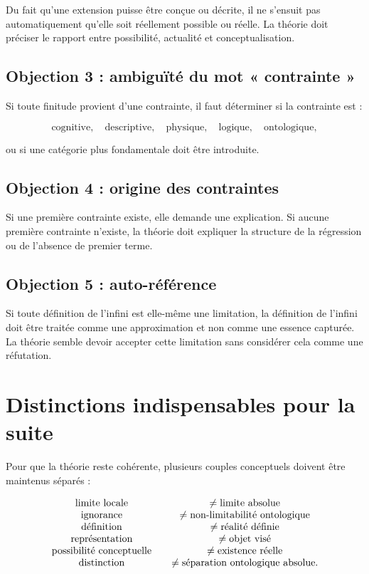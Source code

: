 \documentclass[11pt,a4paper]{article}
\begin{document}
Du fait qu'une extension puisse être conçue ou décrite, il ne s'ensuit pas automatiquement qu'elle soit réellement possible ou réelle. La théorie doit préciser le rapport entre possibilité, actualité et conceptualisation.

\subsection{Objection 3 : ambiguïté du mot « contrainte »}

Si toute finitude provient d'une contrainte, il faut déterminer si la contrainte est :

\[
\text{cognitive},\quad \text{descriptive},\quad \text{physique},\quad \text{logique},\quad \text{ontologique},
\]

ou si une catégorie plus fondamentale doit être introduite.

\subsection{Objection 4 : origine des contraintes}

Si une première contrainte existe, elle demande une explication. Si aucune première contrainte n'existe, la théorie doit expliquer la structure de la régression ou de l'absence de premier terme.

\subsection{Objection 5 : auto-référence}

Si toute définition de l'infini est elle-même une limitation, la définition de l'infini doit être traitée comme une approximation et non comme une essence capturée. La théorie semble devoir accepter cette limitation sans considérer cela comme une réfutation.

\section{Distinctions indispensables pour la suite}

Pour que la théorie reste cohérente, plusieurs couples conceptuels doivent être maintenus séparés :

\[
\begin{array}{c@{\qquad}c}
\text{limite locale} & \neq \text{limite absolue}\\
\text{ignorance} & \neq \text{non-limitabilité ontologique}\\
\text{définition} & \neq \text{réalité définie}\\
\text{représentation} & \neq \text{objet visé}\\
\text{possibilité conceptuelle} & \neq \text{existence réelle}\\
\text{distinction} & \neq \text{séparation ontologique absolue}.
\end{array}
\]
\end{document}
